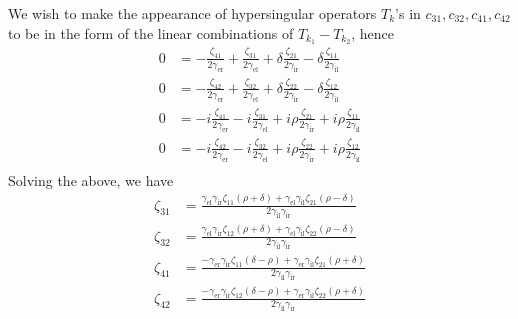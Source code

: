 We wish to make the appearance of hypersingular operators $T_k$'s in $c_{31}, c_{32}, c_{41}, c_{42}$ to be in the form of the linear combinations of $T_{k_1} - T_{k_2}$, hence
\begin{align*}
  0 &= -\frac{\zeta_{41}}{2 \gamma_\text{er}}+\frac{\zeta_{31}}{2 \gamma_\text{el}}+\delta \frac{\zeta_{21}}{2 \gamma_\text{ir}}-\delta \frac{\zeta_{11}}{2 \gamma_\text{il}} \\
  0 &= -\frac{\zeta_{42}}{2 \gamma_\text{er}}+\frac{\zeta_{32}}{2 \gamma_\text{el}}+\delta\frac{\zeta_{22}}{2 \gamma_\text{ir}}-\delta\frac{\zeta_{12}}{2 \gamma_\text{il}} \\
  0 &= -i\frac{\zeta_{41}}{2 \gamma_\text{er}}-i\frac{\zeta_{31}}{2 \gamma_\text{el}}+i \rho \frac{\zeta_{21}}{2 \gamma_\text{ir}}+i \rho \frac{\zeta_{11}}{2 \gamma_\text{il}} \\
  0 &= -i\frac{\zeta_{42}}{2 \gamma_\text{er}}-i\frac{\zeta_{32}}{2 \gamma_\text{el}}+i \rho\frac{\zeta_{22}}{2 \gamma_\text{ir}}+i \rho\frac{\zeta_{12}}{2 \gamma_\text{il}} \\
\end{align*}
Solving the above, we have
\begin{align*}
  \zeta_{31} &= \frac{\gamma_\text{el}\gamma_\text{ir}\zeta_{11}(\rho + \delta) + \gamma_\text{el}\gamma_\text{il}\zeta_{21}(\rho - \delta)}{2\gamma_\text{il}\gamma_\text{ir}}\\
  \zeta_{32} &= \frac{\gamma_\text{el}\gamma_\text{ir}\zeta_{12}(\rho + \delta) + \gamma_\text{el}\gamma_\text{il}\zeta_{22}(\rho - \delta)}{2\gamma_\text{il}\gamma_\text{ir}}\\
  \zeta_{41} &= \frac{-\gamma_\text{er}\gamma_\text{ir}\zeta_{11}(\delta - \rho) + \gamma_\text{er}\gamma_\text{il}\zeta_{21}(\rho + \delta)}{2\gamma_\text{il}\gamma_\text{ir}}\\
  \zeta_{42} &= \frac{-\gamma_\text{er}\gamma_\text{ir}\zeta_{12}(\delta - \rho) + \gamma_\text{er}\gamma_\text{il}\zeta_{22}(\rho + \delta)}{2\gamma_\text{il}\gamma_\text{ir}}\\
\end{align*}

